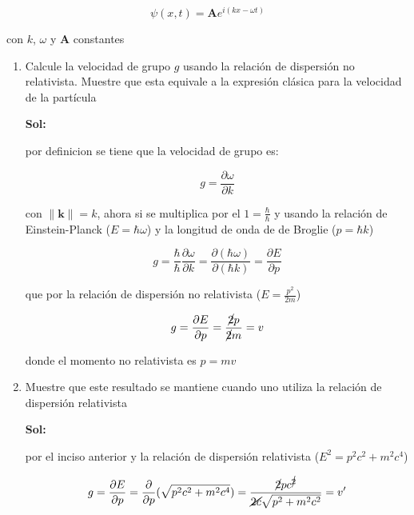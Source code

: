 \documentclass[12pt,a4paper]{article}
\providecommand{\norm}[1]{\lVert#1\rVert}
\begin{document}
\begin{enumerate}
    \begin{equation*}
        \psi (x,t) = \mathbf{A} e^{i(kx-\omega t)}
    \end{equation*}
    
    con $k$, $\omega$ y $\mathbf{A}$ constantes
    
    \begin{enumerate}
        \item Calcule la velocidad de grupo $g$ usando la relación de dispersión no relativista. Muestre que esta equivale a la expresión clásica para la velocidad de la partícula
        
        \textbf{Sol:}
        
        por definicion se tiene que la velocidad de grupo es:
        
        \begin{equation*}
            g = \frac{\partial \omega}{\partial k}
        \end{equation*}
        
        con $\norm{\mathbf{k}} = k$, ahora si se multiplica por el $1= \frac{\hbar}{\hbar}$ y usando la relación de Einstein-Planck ($E =\hbar \omega$) y la longitud de onda de de Broglie ($p = \hbar k$)
        
        \begin{equation*}
            g= \frac{\hbar}{\hbar} \frac{\partial \omega}{\partial k} = \frac{\partial (\hbar\omega)}{\partial (\hbar k)} = \frac{\partial E}{\partial p}
        \end{equation*}
        
        que por la relación de dispersión no relativista ($E = \frac{p^2}{2m}$)
        
        \begin{equation*}
            g = \frac{\partial E}{\partial p} = \frac{\cancel{2}p}{\cancel{2}m} = v
        \end{equation*}
        
        donde el momento no relativista es $p =mv$
        
        \item Muestre que este resultado se mantiene cuando uno utiliza la relación de dispersión relativista
        
        \textbf{Sol:}
        
        por el inciso anterior y la relación de dispersión relativista ($E^2 = p^2c^2 + m^2 c^4$)
        
        \begin{equation*}
            g = \frac{\partial E}{\partial p} = \frac{\partial}{\partial p} (\sqrt{p^2c^2 + m^2 c^4}) = \frac{\cancel{2}pc^{\cancel{2}}}{\cancel{2c}\sqrt{p^2 + m^2 c^2}} = v'
        \end{equation*}
        

\end{enumerate}
\end{enumerate}
\end{document}
